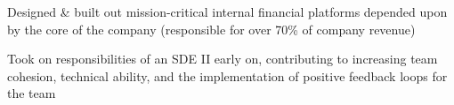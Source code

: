 \documentclass[]{two-column-resume}
\begin{document}
\begin{minipage}[t]{0.65\textwidth}

\vspace{\topsep} %

\begin{tightemize}
\item Designed \& built out mission-critical internal financial platforms depended upon by the core of the company (responsible for over 70\% of company revenue)
\item Took on responsibilities of an SDE II early on, contributing to increasing team cohesion, technical ability, and the implementation of positive feedback loops for the team
\end{tightemize}
\sectionsep









\end{minipage}
\end{document}
